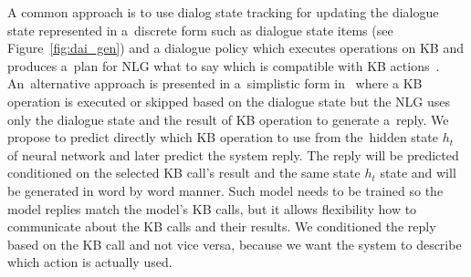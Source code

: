 \documentclass[11pt]{article}
\begin{document}
A common approach is to use dialog state tracking for updating the dialogue state represented in a~discrete form such as dialogue state items (see Figure~\ref{fig:dai_gen}) and a dialogue policy which executes operations on KB and produces a~plan for NLG what to say which is compatible with KB actions~\cite{dusek_sequence2sequence_2016,young2010hidden}.
An~alternative approach is presented in a~simplistic form in~\cite{wen_networkbased_2016} where a KB operation is executed or skipped based on the dialogue state but the NLG uses only the dialogue state and the result of KB operation to generate a~reply.
We propose to predict directly which KB operation to use from the~hidden state $h_t$ of neural network and later predict the system reply.
The reply will be predicted conditioned on the selected KB call's result and the same state $h_t$ state and will be generated in word by word manner.
Such model needs to be trained so the model replies match the model's KB calls, but it allows flexibility how to communicate about the KB calls and their results.
We conditioned the reply based on the KB call and not vice versa, because we want the system to describe which action is actually used. 
\end{document}
